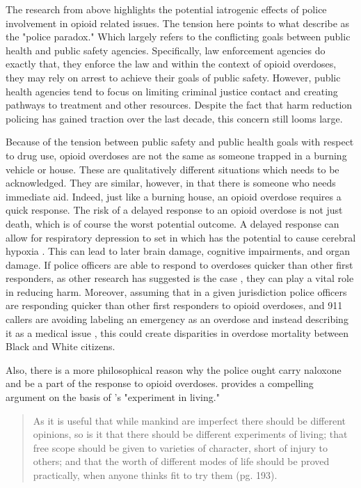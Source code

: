 The research from above highlights the potential iatrogenic effects of police involvement in opioid related issues. The tension here points to what \textcite{carroll_police_2023} describe as the "police paradox." Which largely refers to the conflicting goals between public health and public safety agencies. Specifically, law enforcement agencies do exactly that, they enforce the law and within the context of opioid overdoses, they may rely on arrest to achieve their goals of public safety. However, public health agencies tend to focus on limiting criminal justice contact and creating pathways to treatment and other resources. Despite the fact that harm reduction policing has gained traction over the last decade, this concern still looms large.

Because of the tension between public safety and public health goals with respect to drug use, opioid overdoses are not the same as someone trapped in a burning vehicle or house. These are qualitatively different situations which needs to be acknowledged. They are similar, however, in that there is someone who needs immediate aid. Indeed, just like a burning house, an opioid overdose requires a quick response. The risk of a delayed response to an opioid overdose is not just death, which is of course the worst potential outcome. A delayed response can allow for respiratory depression to set in which has the potential to cause cerebral hypoxia \parencite{winstanley_neurocognitive_2021}. This can lead to later brain damage, cognitive impairments, and organ damage. If police officers are able to respond to overdoses quicker than other first responders, as other research has suggested is the case \parencite{pourtaher_naloxone_2022, white_leveraging_2022}, they can play a vital role in reducing harm. Moreover, assuming that in a given jurisdiction police officers are responding quicker than other first responders to opioid overdoses, and 911 callers are avoiding labeling an emergency as an overdose and instead describing it as a medical issue \parencite{atkins_disparities_2024}, this could create disparities in overdose mortality between Black and White citizens. 

Also, there is a more philosophical reason why the police ought carry naloxone and be a part of the response to opioid overdoses. \textcite{monaghan_broken_2022} provides a compelling argument on the basis of \textcite{mill_liberty_1998}'s  "experiment in living." 

\begin{quote}
As it is useful that while mankind are imperfect there should be different opinions, so is it that there should be different experiments of living; that free scope should be given to varieties of character, short of injury to others; and that the worth of different modes of life should be proved practically, when anyone thinks fit to try them (pg. 193).
\end{quote}

